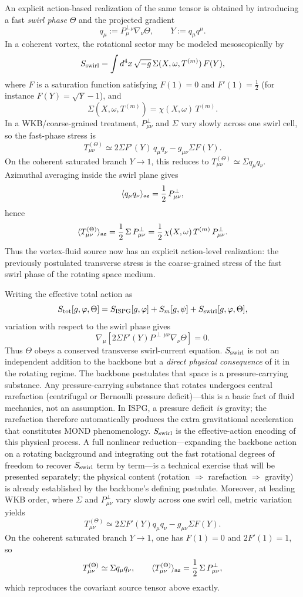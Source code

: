 \documentclass[11pt]{article}
\begin{document}
An explicit action-based realization of the same tensor is obtained by
introducing a fast \emph{swirl phase} $\Theta$ and the projected gradient
\[
q_\mu := P^\perp_{\mu}{}^{\nu}\nabla_\nu\Theta,
\qquad
Y:=q_\mu q^\mu.
\]
In a coherent vortex, the rotational sector may be modeled mesoscopically by
\[
S_{\rm swirl}
= \int d^4x\,\sqrt{-g}\,
\Sigma(X,\omega,T^{(m)})\,F(Y),
\]
where $F$ is a saturation function satisfying
$F(1)=0$ and $F'(1)=\tfrac12$
(for instance $F(Y)=\sqrt{Y}-1$), and
\[
\Sigma(X,\omega,T^{(m)})
= \chi(X,\omega)\,T^{(m)}.
\]
In a WKB/coarse-grained treatment, $P^\perp_{\mu\nu}$ and $\Sigma$ vary slowly
across one swirl cell, so the fast-phase stress is
\[
T^{(\Theta)}_{\mu\nu}
\simeq 2\Sigma F'(Y)\,q_\mu q_\nu
      - g_{\mu\nu}\Sigma F(Y).
\]
On the coherent saturated branch $Y\to1$, this reduces to
$T^{(\Theta)}_{\mu\nu}\simeq \Sigma q_\mu q_\nu$.  Azimuthal averaging inside
the swirl plane gives
\[
\langle q_\mu q_\nu\rangle_{\rm az}
= \frac12\,P^\perp_{\mu\nu},
\]
hence
\[
\langle T^{(\Theta)}_{\mu\nu}\rangle_{\rm az}
= \frac12\,\Sigma\,P^\perp_{\mu\nu}
= \frac12\,\chi(X,\omega)\,T^{(m)}\,P^\perp_{\mu\nu}.
\]
Thus the vortex-fluid source now has an explicit action-level realization:
the previously postulated transverse stress is the coarse-grained stress of
the fast swirl phase of the rotating space medium.

Writing the effective total action as
\[
S_{\rm tot}[g,\varphi,\Theta]
= S_{\rm ISPG}[g,\varphi] + S_m[g,\psi] + S_{\rm swirl}[g,\varphi,\Theta],
\]
variation with respect to the swirl phase gives
\[
\nabla_\mu\!\left[
2\Sigma F'(Y)P^{\perp\,\mu\nu}\nabla_\nu\Theta
\right]=0.
\]
Thus $\Theta$ obeys a conserved transverse swirl-current equation.
$S_{\rm swirl}$ is not an independent addition to the backbone
but a \emph{direct physical consequence} of it in the rotating regime.
The backbone postulates that space is a pressure-carrying substance.
Any pressure-carrying substance that rotates undergoes central
rarefaction (centrifugal or Bernoulli pressure deficit)---this is
a basic fact of fluid mechanics, not an assumption.  In ISPG,
a pressure deficit \emph{is} gravity; the rarefaction therefore
automatically produces the extra gravitational acceleration that
constitutes MOND phenomenology.  $S_{\rm swirl}$ is the
effective-action encoding of this physical process.
A full nonlinear reduction---expanding the backbone action on a
rotating background and integrating out the fast rotational
degrees of freedom to recover $S_{\rm swirl}$ term by term---is
a technical exercise that will be presented separately; the
physical content (rotation $\Rightarrow$ rarefaction $\Rightarrow$
gravity) is already established by the backbone's defining
postulate.
Moreover, at leading WKB order, where $\Sigma$ and $P^\perp_{\mu\nu}$ vary
slowly across one swirl cell, metric variation yields
\[
T^{(\Theta)}_{\mu\nu}
\simeq 2\Sigma F'(Y)q_\mu q_\nu
      - g_{\mu\nu}\Sigma F(Y).
\]
On the coherent saturated branch $Y\to1$, one has $F(1)=0$ and
$2F'(1)=1$, so
\[
T^{(\Theta)}_{\mu\nu}\simeq \Sigma q_\mu q_\nu,
\qquad
\langle T^{(\Theta)}_{\mu\nu}\rangle_{\rm az}
= \frac12\,\Sigma\,P^\perp_{\mu\nu},
\]
which reproduces the covariant source tensor above exactly.
\end{document}
